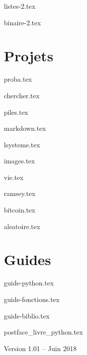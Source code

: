 \documentclass[11pt,twoside,openright]{report}
\begin{document}
{listes-2.tex}

{binaire-2.tex}


\clearemptydoublepage
\part{Projets}

{proba.tex}

{chercher.tex}

{piles.tex}

{markdown.tex}

{lsysteme.tex}

{images.tex}

{vie.tex}

{ramsey.tex}

{bitcoin.tex}

{aleatoire.tex}






\clearemptydoublepage
\part{Guides}

{guide-python.tex}

{guide-fonctions.tex}

{guide-biblio.tex}



\clearemptydoublepage


{postface_livre_python.tex}

\vfill
\bigskip
\bigskip

\centerline{Version 1.01 -- Juin 2018}
\end{document}
